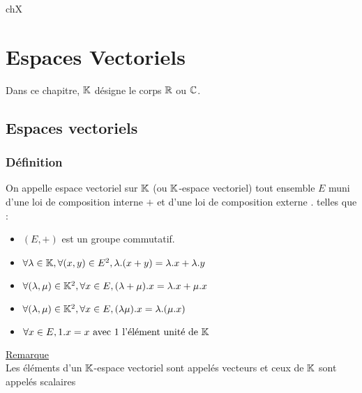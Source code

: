 ch{X}\chapter{Espaces Vectoriels}

\minitoc
Dans ce chapitre, \(\mathbb{K}\) désigne le corps \(\mathbb{R}\) ou \(\mathbb{C}\).
\section{Espaces vectoriels}
\subsection{Définition}
\begin{defi}
    On appelle espace vectoriel sur \(\mathbb{K}\) (ou \( \mathbb{K}\)-espace vectoriel) tout ensemble \(E\) muni d’une loi de composition interne \(+\) et d’une loi de composition externe \(.\) telles que :
    \begin{itemize}
        \item \((E, +)\) est un groupe commutatif.
        \item \(\forall \lambda \in  \mathbb{K}, \forall (x, y) \in  E^2, \lambda.(x + y) = \lambda.x + \lambda.y\)
        \item \(\forall (\lambda, \mu ) \in  \mathbb{K}^2, \forall x \in  E, (\lambda + \mu ).x = \lambda.x + \mu .x\)
        \item \(\forall (\lambda, \mu ) \in  \mathbb{K}^2, \forall x \in  E, (\lambda\mu ).x = \lambda.(\mu .x)\)
        \item \(\forall x \in  E, 1.x = x \text{ avec }1 \text{ l’élément unité de }\mathbb{K}\)
    \end{itemize}
    \underline{Remarque}\\
    Les éléments d’un \(\mathbb{K}\)-espace vectoriel sont appelés vecteurs et ceux de \(\mathbb{K}\) sont appelés scalaires
\end{defi}

